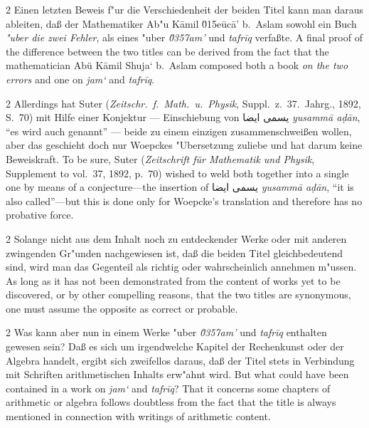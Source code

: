\documentclass[10pt,a4paper]{article}
\renewcommand{\switchcolumn}{\syncronize\nointerlineskip\columnbreak}
\newcommand{\RL}[1]{\beginR#1\endR}
\newcommand{\ar}[1]{{\arabicfont\RL{#1}}}
\newcommand{\enquote}[1]{``#1''}
\begin{document}
\begin{paracol}{2}
Einen letzten Beweis f"ur die Verschiedenheit der beiden Titel kann man daraus ableiten, da\ss{} der Mathematiker Ab"u K\=amil \u015e\=uc\=a' b.\ Aslam sowohl ein Buch \textit{"uber die zwei Fehler}, als eines "uber \textit{\u0357{}am'} und \textit{tafr\={i}q} verfa\ss{}te.
\switchcolumn
A final proof of the difference between the two titles can be derived from the fact that the mathematician Ab\"u K\=amil Shuja` b.\ Aslam composed both a book \textit{on the two errors} and one on \textit{jam`} and \textit{tafr\={i}q}.
\end{paracol}

\begin{paracol}{2}
Allerdings hat Suter (\textit{Zeitschr.\ f.\ Math.\ u.\ Physik}, Suppl.\ z.\ 37.\ Jahrg., 1892, S.\ 70) mit Hilfe einer Konjektur --- Einschiebung von \ar{يسمى ايضا} \textit{yusamm\=a a\d{d}\=an}, \enquote{es wird auch genannt} --- beide zu einem einzigen zusammenschwei\ss{}en wollen, aber das geschieht doch nur Woepckes "Ubersetzung zuliebe und hat darum keine Beweiskraft.
\switchcolumn
To be sure, Suter (\textit{Zeitschrift f\"ur Mathematik und Physik}, Supplement to vol.\ 37, 1892, p.\ 70) wished to weld both together into a single one by means of a conjecture---the insertion of \ar{يسمى ايضا} \textit{yusamm\=a a\d{d}\=an}, ``it is also called''---but this is done only for Woepcke's translation and therefore has no probative force.
\end{paracol}

\begin{paracol}{2}
Solange nicht aus dem Inhalt noch zu entdeckender Werke oder mit anderen zwingenden Gr"unden nachgewiesen ist, da\ss{} die beiden Titel gleichbedeutend sind, wird man das Gegenteil als richtig oder wahrscheinlich annehmen m"ussen.
\switchcolumn
As long as it has not been demonstrated from the content of works yet to be discovered, or by other compelling reasons, that the two titles are synonymous, one must assume the opposite as correct or probable.
\end{paracol}

\begin{paracol}{2}
Was kann aber nun in einem Werke "uber \textit{\u0357{}am'} und \textit{tafr\={i}q} enthalten gewesen sein? Da\ss{} es sich um irgendwelche Kapitel der Rechenkunst oder der Algebra handelt, ergibt sich zweifellos daraus, da\ss{} der Titel stets in Verbindung mit Schriften arithmetischen Inhalts erw"ahnt wird.
\switchcolumn
But what could have been contained in a work on \textit{jam`} and \textit{tafr\={i}q}? That it concerns some chapters of arithmetic or algebra follows doubtless from the fact that the title is always mentioned in connection with writings of arithmetic content.
\end{paracol}
\end{document}
